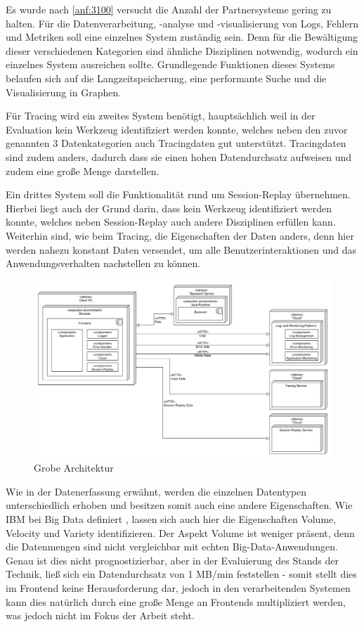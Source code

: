 	Es wurde nach \autoref{anf:3100} versucht die Anzahl der Partnersysteme gering zu halten. Für die Datenverarbeitung, -analyse und -visualisierung von Logs, Fehlern und Metriken soll eine einzelnes System zuständig sein. Denn für die Bewältigung dieser verschiedenen Kategorien sind ähnliche Disziplinen notwendig, wodurch ein einzelnes System ausreichen sollte. Grundlegende Funktionen dieses Systems belaufen sich auf die Langzeitspeicherung, eine performante Suche und die Visualisierung in Graphen.
	
	Für Tracing wird ein zweites System benötigt, hauptsächlich weil in der Evaluation kein Werkzeug identifiziert werden konnte, welches neben den zuvor genannten 3 Datenkategorien auch Tracingdaten gut unterstützt. Tracingdaten sind zudem anders, dadurch dass sie einen hohen Datendurchsatz aufweisen und zudem eine große Menge darstellen.
	
	Ein drittes System soll die Funktionalität rund um Session-Replay übernehmen. Hierbei liegt auch der Grund darin, dass kein Werkzeug identifiziert werden konnte, welches neben Session-Replay auch andere Disziplinen erfüllen kann. Weiterhin sind, wie beim Tracing, die Eigenschaften der Daten anders, denn hier werden nahezu konstant Daten versendet, um alle Benutzerinteraktionen und das Anwendungsverhalten nachstellen zu können.
	
\begin{figure}[H]
	\centering
	\includegraphics[width=0.65\linewidth]{img/04_erstellung-poc/konzept-simple.png}
	\caption{Grobe Architektur}
	\label{fig:grobe-architektur}
\end{figure}

Wie in der Datenerfassung erwähnt, werden die einzelnen Datentypen unterschiedlich erhoben und besitzen somit auch eine andere Eigenschaften. Wie IBM bei Big Data definiert \cite{ZikopoulosUnderstandingBigData}, lassen sich auch hier die Eigenschaften Volume, Velocity und Variety identifizieren. Der Aspekt Volume ist weniger präsent, denn die Datenmengen sind nicht vergleichbar mit echten Big-Data-Anwendungen. Genau ist dies nicht prognostizierbar, aber in der Evaluierung des Stands der Technik, ließ sich ein Datendurchsatz von 1 MB/min feststellen - somit stellt dies im Frontend keine Herausforderung dar, jedoch in den verarbeitenden Systemen kann dies natürlich durch eine große Menge an Frontends multipliziert werden, was jedoch nicht im Fokus der Arbeit steht.

